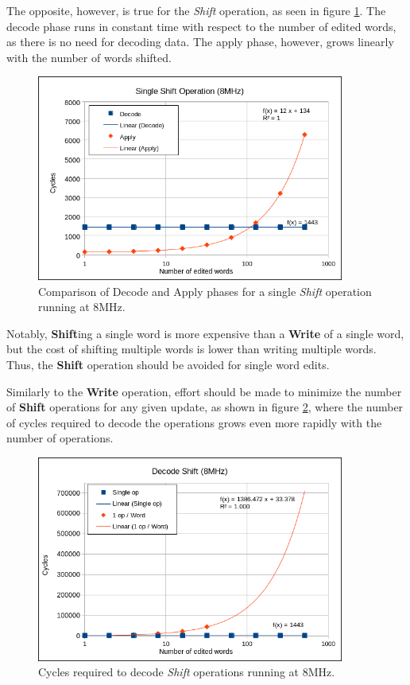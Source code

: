 The opposite, however, is true for the \textit{Shift} operation, as seen in figure \ref{fig:sDecodeVsApply}. The decode phase runs in constant time with respect to the number of edited words, as there is no need for decoding data. The apply phase, however, grows linearly with the number of words shifted.
\begin{figure}[!ht]
    \centering
    \includegraphics[width=0.9\textwidth]{img/SDecodeVsApply.png}
    \caption{Comparison of Decode and Apply phases for a single \textit{Shift} operation running at 8MHz.}
    \label{fig:sDecodeVsApply}
\end{figure}

Notably, \textbf{Shift}ing a single word is more expensive than a \textbf{Write} of a single word, but the cost of shifting multiple words is lower than writing multiple words. Thus, the \textbf{Shift} operation should be avoided for single word edits. 

Similarly to the \textbf{Write} operation, effort should be made to minimize the number of \textbf{Shift} operations for any given update, as shown in figure \ref{fig:sDecode8}, where the number of cycles required to decode the operations grows even more rapidly with the number of operations.
\begin{figure}[!ht]
    \centering
    \includegraphics[width=0.9\textwidth]{img/SDecode8.png}
    \caption{Cycles required to decode \textit{Shift} operations running at 8MHz.}
    \label{fig:sDecode8}
\end{figure}

